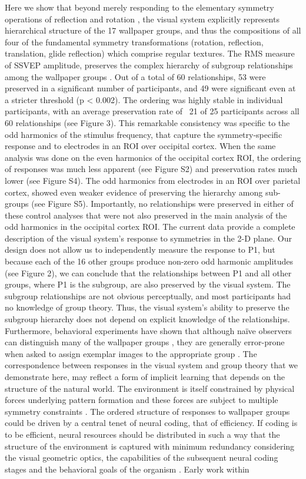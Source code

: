 \documentclass[9pt,twocolumn,twoside,lineno]{pnas-new}
\begin{document}
Here we show that beyond merely responding to the elementary symmetry operations of reflection \cite{RN1170} and rotation \cite{RN1725}, the visual system explicitly represents hierarchical structure of the 17 wallpaper groups, and thus the compositions of all four of the fundamental symmetry transformations (rotation, reflection, translation, glide reflection) which comprise regular textures. The RMS measure of SSVEP amplitude, preserves the complex hierarchy of subgroup relationships among the wallpaper groups \cite{RN1711}. Out of a total of 60 relationships, 53 were preserved in a significant number of participants, and 49 were significant even at a stricter threshold (p < 0.002). The ordering was highly stable in individual participants, with an average preservation rate of ~21 of 25 participants across all 60 relationships (see Figure 3). This remarkable consistency was specific to the odd harmonics of the stimulus frequency, that capture the symmetry-specific response \cite{RN1725} and to electrodes in an ROI over occipital cortex. When the same analysis was done on the even harmonics of the occipital cortex ROI, the ordering of responses was much less apparent (see Figure S2) and preservation rates much lower (see Figure S4). The odd harmonics from electrodes in an ROI over parietal cortex, showed even weaker evidence of preserving the hierarchy among sub-groups (see Figure S5). Importantly, no relationships were preserved in either of these control analyses that were not also preserved in the main analysis of the odd harmonics in the occipital cortex ROI. The current data provide a complete description of the visual system’s response to symmetries in the 2-D plane. Our design does not allow us to independently measure the response to P1, but because each of the 16 other groups produce non-zero odd harmonic amplitudes (see Figure 2), we can conclude that the relationships between P1 and all other groups, where P1 is the subgroup, are also preserved by the visual system. The subgroup relationships are not obvious perceptually, and most participants had no knowledge of group theory. Thus, the visual system’s ability to preserve the subgroup hierarchy does not depend on explicit knowledge of the relationships. Furthermore, behavioral experiments have shown that although naïve observers can distinguish many of the wallpaper groups \cite{RN1253}, they are generally error-prone when asked to assign exemplar images to the appropriate group \cite{RN172}. The correspondence between responses in the visual system and group theory that we demonstrate here, may reflect a form of implicit learning that depends on the structure of the natural world. The environment is itself constrained by physical forces underlying pattern formation and these forces are subject to multiple symmetry constraints \cite{RN1634}. The ordered structure of responses to wallpaper groups could be driven by a central tenet of neural coding, that of efficiency. If coding is to be efficient, neural resources should be distributed in such a way that the structure of the environment is captured with minimum redundancy considering the visual geometric optics, the capabilities of the subsequent neural coding stages and the behavioral goals of the organism \cite{RN1758, RN1760, RN1757, RN1756}. Early work within 
\end{document}
